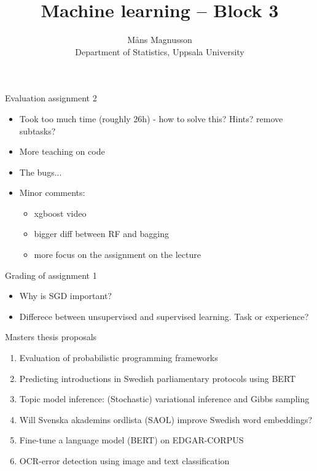 \documentclass[10pt]{beamer}
\title[]{{\color{black}Machine learning -- Block 3}}
\author[]{M{\aa}ns Magnusson\\Department of Statistics, Uppsala University}
\date{\currentsemester}
\begin{document}
\frame{\titlepage
}






\begin{frame}{Evaluation assignment 2}
\begin{itemize}
\item Took too much time (roughly 26h) - how to solve this? Hints? remove subtasks?
\item More teaching on code
\item The bugs...
\item Minor comments:
\begin{itemize}
\item xgboost video
\item bigger diff between RF and bagging
\item more focus on the assignment on the lecture
\end{itemize}
\end{itemize}
\end{frame}

\begin{frame}{Grading of assignment 1}
\begin{itemize}
\item Why is SGD important?
\item Differece between unsupervised and supervised learning. Task or experience?
\end{itemize}
\end{frame}

\begin{frame}{Masters thesis proposals}
\begin{enumerate}
\item Evaluation of probabilistic programming frameworks
\item Predicting introductions in Swedish parliamentary protocols using BERT
\item Topic model inference: (Stochastic) variational inference and Gibbs sampling
\item Will Svenska akademins ordlista (SAOL) improve Swedish word embeddings?
\item Fine-tune a language model (BERT) on EDGAR-CORPUS
\item OCR-error detection using image and text classification
\end{enumerate}
\end{frame}
\end{document}
